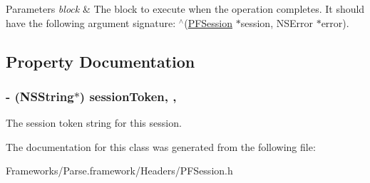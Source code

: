 \begin{DoxyParams}{Parameters}
{\em block} & The block to execute when the operation completes. It should have the following argument signature\+: {\ttfamily $^\wedge$(\hyperlink{interface_p_f_session}{P\+F\+Session} $\ast$session, N\+S\+Error $\ast$error)}. \\
\hline
\end{DoxyParams}


\subsection{Property Documentation}
\hypertarget{interface_p_f_session_a9e2e9da02a395f3b549cc0cca89e3baa}{}
\subsubsection[{session\+Token}]{\setlength{\rightskip}{0pt plus 5cm}-\/ (N\+S\+String$\ast$) session\+Token\hspace{0.3cm}{\ttfamily [read]}, {\ttfamily [nonatomic]}, {\ttfamily [copy]}}\label{interface_p_f_session_a9e2e9da02a395f3b549cc0cca89e3baa}
The session token string for this session. 

The documentation for this class was generated from the following file\+:\begin{DoxyCompactItemize}
\item 
Frameworks/\+Parse.\+framework/\+Headers/P\+F\+Session.\+h\end{DoxyCompactItemize}

